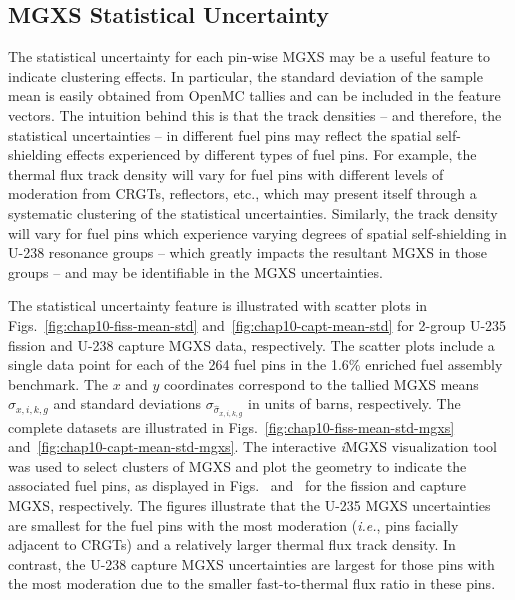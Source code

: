 

\subsection{MGXS Statistical Uncertainty}
\label{subsec:chap10-stat-uncertainty}

The statistical uncertainty for each pin-wise \ac{MGXS} may be a useful feature to indicate clustering effects. In particular, the standard deviation of the sample mean is easily obtained from OpenMC tallies and can be included in the feature vectors. The intuition behind this is that the track densities -- and therefore, the statistical uncertainties -- in different fuel pins may reflect the spatial self-shielding effects experienced by different types of fuel pins. For example, the thermal flux track density will vary for fuel pins with different levels of moderation from \acp{CRGT}, reflectors, etc., which may present itself through a systematic clustering of the statistical uncertainties. Similarly, the track density will vary for fuel pins which experience varying degrees of spatial self-shielding in U-238 resonance groups -- which greatly impacts the resultant \ac{MGXS} in those groups -- and may be identifiable in the \ac{MGXS} uncertainties.

The statistical uncertainty feature is illustrated with scatter plots in Figs.~\ref{fig:chap10-fiss-mean-std} and~\ref{fig:chap10-capt-mean-std} for 2-group U-235 fission and U-238 capture \ac{MGXS} data, respectively. The scatter plots include a single data point for each of the 264 fuel pins in the 1.6\% enriched fuel assembly benchmark. The $x$ and $y$ coordinates correspond to the tallied \ac{MGXS} means $\hat{\sigma}_{x,i,k,g}$ and standard deviations $\sigma_{\hat{\sigma}_{x,i,k,g}}$ in units of barns, respectively. The complete datasets are illustrated in Figs.~\ref{fig:chap10-fiss-mean-std-mgxs} and~\ref{fig:chap10-capt-mean-std-mgxs}. The interactive \textit{i}\ac{MGXS} visualization tool was used to select clusters of \ac{MGXS} and plot the geometry to indicate the associated fuel pins, as displayed in Figs.~ and~ for the fission and capture \ac{MGXS}, respectively. The figures illustrate that the U-235 \ac{MGXS} uncertainties are smallest for the fuel pins with the most moderation (\textit{i.e.}, pins facially adjacent to \acp{CRGT}) and a relatively larger thermal flux track density. In contrast, the U-238 capture \ac{MGXS} uncertainties are largest for those pins with the most moderation due to the smaller fast-to-thermal flux ratio in these pins.

